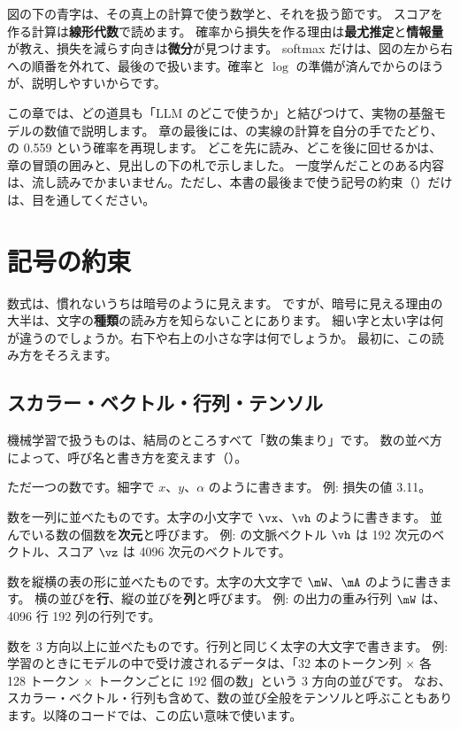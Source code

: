 図の下の青字は、その真上の計算で使う数学と、それを扱う節です。
スコアを作る計算は\textbf{線形代数}で読めます。
確率から損失を作る理由は\textbf{最尤推定}と\textbf{情報量}が教え、損失を減らす向きは\textbf{微分}が見つけます。
softmax だけは、図の左から右への順番を外れて、最後ので扱います。確率と $\log$ の準備が済んでからのほうが、説明しやすいからです。

この章では、どの道具も「LLM のどこで使うか」と結びつけて、実物の基盤モデルの数値で説明します。
章の最後には、の実線の計算を自分の手でたどり、の 0.559 という確率を再現します。
どこを先に読み、どこを後に回せるかは、章の冒頭の囲みと、見出しの下の札で示しました。
一度学んだことのある内容は、流し読みでかまいません。ただし、本書の最後まで使う記号の約束（）だけは、目を通してください。

\section{記号の約束}\label{sec:math-notation}

数式は、慣れないうちは暗号のように見えます。
ですが、暗号に見える理由の大半は、文字の\textbf{種類}の読み方を知らないことにあります。
細い字と太い字は何が違うのでしょうか。右下や右上の小さな字は何でしょうか。
最初に、この読み方をそろえます。

\subsection*{スカラー・ベクトル・行列・テンソル}

機械学習で扱うものは、結局のところすべて「数の集まり」です。
数の並べ方によって、呼び名と書き方を変えます（）。

\begin{description}[leftmargin=1em]
\item[\term{スカラー}{scalar}] ただ一つの数です。細字で $x$、$y$、$\alpha$ のように書きます。
例: 損失の値 3.11。
\item[\term{ベクトル}{vector}] 数を一列に並べたものです。太字の小文字で $\vx$、$\vh$ のように書きます。
並んでいる数の個数を\textbf{次元}と呼びます。
例: の文脈ベクトル $\vh$ は 192 次元のベクトル、スコア $\vz$ は 4096 次元のベクトルです。
\item[\term{行列}{matrix}] 数を縦横の表の形に並べたものです。太字の大文字で $\mW$、$\mA$ のように書きます。
横の並びを\textbf{行}、縦の並びを\textbf{列}と呼びます。
例: の出力の重み行列 $\mW$ は、4096 行 192 列の行列です。
\item[\term{テンソル}{tensor}] 数を 3 方向以上に並べたものです。行列と同じく太字の大文字で書きます。
例: 学習のときにモデルの中で受け渡されるデータは、「32 本のトークン列 $\times$ 各 128 トークン $\times$ トークンごとに 192 個の数」という 3 方向の並びです。
なお、スカラー・ベクトル・行列も含めて、数の並び全般をテンソルと呼ぶこともあります。以降のコードでは、この広い意味で使います。
\end{description}

